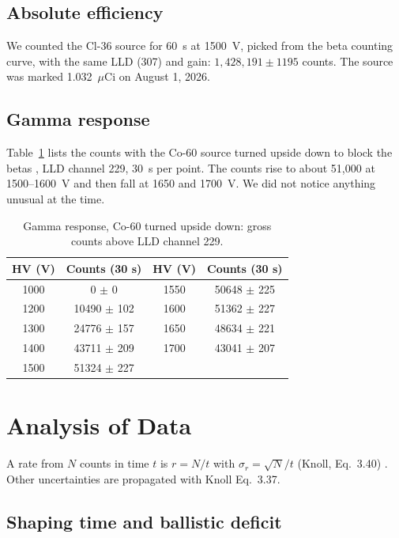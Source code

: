 \documentclass[12pt]{article}
\begin{document}
\subsection{Absolute efficiency}

We counted the Cl-36 source for 60~s at 1500~V, picked from the beta counting curve, with the same LLD (307) and gain: $1{,}428{,}191 \pm 1195$ counts. The source was marked 1.032~$\mu$Ci on August 1, 2026.

\subsection{Gamma response}

Table~\ref{tab:rawgamma} lists the counts with the Co-60 source turned upside down to block the betas \cite{labmanual}, LLD channel 229, 30~s per point. The counts rise to about 51,000 at 1500--1600~V and then fall at 1650 and 1700~V. We did not notice anything unusual at the time.

\begin{table}[!htbp]
\centering\small
\begin{tabular}{cc|cc}
\toprule
\textbf{HV (V)} & \textbf{Counts (30 s)} & \textbf{HV (V)} & \textbf{Counts (30 s)} \\
\midrule
1000 & 0 $\pm$ 0 & 1550 & 50648 $\pm$ 225 \\
1200 & 10490 $\pm$ 102 & 1600 & 51362 $\pm$ 227 \\
1300 & 24776 $\pm$ 157 & 1650 & 48634 $\pm$ 221 \\
1400 & 43711 $\pm$ 209 & 1700 & 43041 $\pm$ 207 \\
1500 & 51324 $\pm$ 227 & & \\
\bottomrule
\end{tabular}
\caption{Gamma response, Co-60 turned upside down: gross counts above LLD channel 229.}
\label{tab:rawgamma}
\end{table}

\section{Analysis of Data}
\label{sec:analysis}

A rate from $N$ counts in time $t$ is $r = N/t$ with $\sigma_r = \sqrt{N}/t$ (Knoll, Eq.~3.40) \cite{knoll}. Other uncertainties are propagated with Knoll Eq.~3.37.

\subsection{Shaping time and ballistic deficit}
\end{document}
